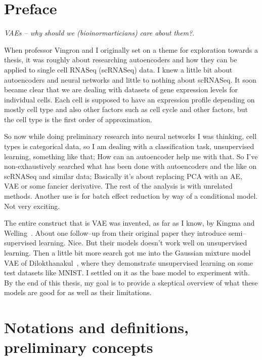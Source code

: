 \documentclass[11pt, a4paper]{report}
\theoremstyle{plain}
\theoremstyle{definition}
\theoremstyle{remark}
\begin{document}

\listoffigures

\tableofcontents


\chapter*{Preface}

\emph{VAEs -- why should we (bioinormarticians) care about them?}.

When professor Vingron and I originally set on a theme for exploration towards a thesis, 
it was roughly about researching autoencoders and how they can be applied 
to single cell RNASeq (scRNASeq) data. I knew a little bit about autoencoders
and neural networks and little to nothing about scRNASeq.
It soon became clear that we are dealing with datasets of gene expression
levels for individual cells. Each cell is supposed to have an expression profile
depending on mostly cell type and also other factors such as cell cycle and
other factors, but the cell type is the first order of approximation.

So now while doing preliminary research into neural networks I was thinking,
cell types is categorical data, so I am dealing with a classification task,
unsupervised learning, something like that; How can an autoencoder help me with
that. So I've non-exhaustively searched what has been done with autoencoders and
the like on scRNASeq and similar data; Basically it's about replacing PCA with
an AE, VAE or some fancier derivative. The rest of the analysis is with
unrelated methods. Another use is for batch effect reduction by way of a
conditional model. Not very exciting.

The entire construct that is VAE was invented, as far as I know, by Kingma and
Welling~\cite{kingma2013auto,kingma2014semi,}. About one follow--up from
their original paper they introduce semi--supervised learning. Nice.
But their models doesn't work well on unsupervised learning.
Then a little bit more search got me into the Gaussian mixture model VAE of
Dilokthanakul~\cite{dilokthanakul2016deep}, 
where they demonstrate
unsupervised learning on some test datasets like MNIST.
I settled on it as the base model to experiment with.
By the end of this thesis, my goal is to provide a skeptical overview of what
these models are good for as well as their limitations.


\chapter{Notations and definitions, preliminary concepts}
\end{document}
